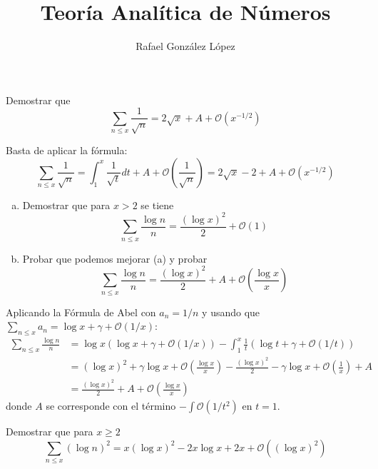 \documentclass[twoside]{article}
\begin{document}
\title{Teoría Analítica de Números}
\author{Rafael González López}
\maketitle

\begin{ejercicio}{1}
Demostrar que
\[ \sum_{n≤x} \frac{1}{\sqrt{n}} =  2 \sqrt{x} + A + \mathcal{O}(x^{-1/2}) \]
\end{ejercicio}
\begin{sol}
Basta de aplicar la fórmula:
\[ \sum_{n≤x} \frac{1}{\sqrt{n}} = \int_1^x \frac{1}{\sqrt{t}}dt + A + \mathcal{O}\left(\frac{1}{\sqrt{n}}\right) = 2 \sqrt{x}-2+A + \mathcal{O}(x^{-1/2}) \]
\end{sol}


\begin{ejercicio}{2}\mbox{}
\begin{enumerate}[(a)]
	\item Demostrar que para $x > 2$ se tiene
	\[ \sum_{n≤x} \frac{\log n}{n} = \frac{(\log x)^2}{2} + \mathcal{O}(1) \]
	\item Probar que podemos mejorar (a) y probar
	\[ \sum_{n≤x} \frac{\log n}{n} = \frac{(\log x)^2}{2} + A + \mathcal{O}\left(\frac{\log x}{x}\right) \]
\end{enumerate}
\end{ejercicio}
\begin{sol}
Aplicando la Fórmula de Abel con $a_n=1/n$ y usando que $\sum_{n≤x} a_n = \log x + γ + \mathcal{O}(1/x)$:
\begin{align*}
	\sum_{n≤x} \frac{\log n}{n} & = \log x (\log x + γ + \mathcal{O}(1/x)) - \int_1^x \frac{1}{t}(\log t + γ + \mathcal{O}(1/t))\\
	& = (\log x)^2 + γ\log x + \mathcal{O}\left(\frac{\log x}{x}\right) - \frac{(\log x)^2}{2} - γ\log x + \mathcal{O}\left(\frac{1}{x}\right) + A\\
	& = \frac{(\log x)^2}{2} + A + \mathcal{O}\left(\frac{\log x}{x}\right)
\end{align*}
donde $A$ se corresponde con el término $-\int \mathcal{O}(1/t^2)$ en $t=1$.
\end{sol}

\begin{ejercicio}{3}
Demostrar que para $x ≥ 2$
\[ \sum_{n≤x} (\log n)^2 = x(\log x)^2 - 2x \log x + 2x + \mathcal{O}((\log x)^2) \]
\end{ejercicio}
\end{document}
